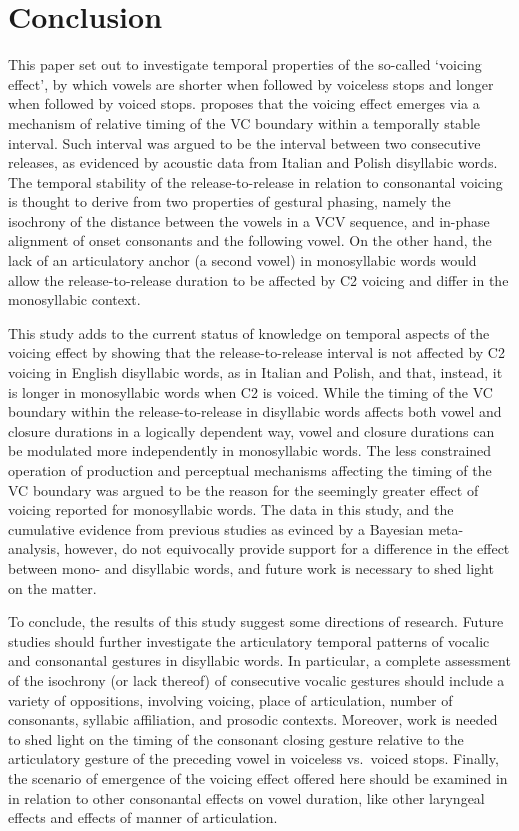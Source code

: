 \documentclass[
  12pt,
  a4paper,
]{article}
\begin{document}
\hypertarget{conclusion}{%
\section{Conclusion}\label{conclusion}}

This paper set out to investigate temporal properties of the so-called
`voicing effect', by which vowels are shorter when followed by voiceless
stops and longer when followed by voiced stops. \citet{coretta2018j}
proposes that the voicing effect emerges via a mechanism of relative
timing of the VC boundary within a temporally stable interval. Such
interval was argued to be the interval between two consecutive releases,
as evidenced by acoustic data from Italian and Polish disyllabic words.
The temporal stability of the release-to-release in relation to
consonantal voicing is thought to derive from two properties of gestural
phasing, namely the isochrony of the distance between the vowels in a
VCV sequence, and in-phase alignment of onset consonants and the
following vowel. On the other hand, the lack of an articulatory anchor
(a second vowel) in monosyllabic words would allow the
release-to-release duration to be affected by C2 voicing and differ in
the monosyllabic context.

This study adds to the current status of knowledge on temporal aspects
of the voicing effect by showing that the release-to-release interval is
not affected by C2 voicing in English disyllabic words, as in Italian
and Polish, and that, instead, it is longer in monosyllabic words when
C2 is voiced. While the timing of the VC boundary within the
release-to-release in disyllabic words affects both vowel and closure
durations in a logically dependent way, vowel and closure durations can
be modulated more independently in monosyllabic words. The less
constrained operation of production and perceptual mechanisms affecting
the timing of the VC boundary was argued to be the reason for the
seemingly greater effect of voicing reported for monosyllabic words. The
data in this study, and the cumulative evidence from previous studies as
evinced by a Bayesian meta-analysis, however, do not equivocally provide
support for a difference in the effect between mono- and disyllabic
words, and future work is necessary to shed light on the matter.

To conclude, the results of this study suggest some directions of
research. Future studies should further investigate the articulatory
temporal patterns of vocalic and consonantal gestures in disyllabic
words. In particular, a complete assessment of the isochrony (or lack
thereof) of consecutive vocalic gestures should include a variety of
oppositions, involving voicing, place of articulation, number of
consonants, syllabic affiliation, and prosodic contexts. Moreover, work
is needed to shed light on the timing of the consonant closing gesture
relative to the articulatory gesture of the preceding vowel in voiceless
vs.~voiced stops. Finally, the scenario of emergence of the voicing
effect offered here should be examined in in relation to other
consonantal effects on vowel duration, like other laryngeal effects and
effects of manner of articulation.

  
\end{document}
